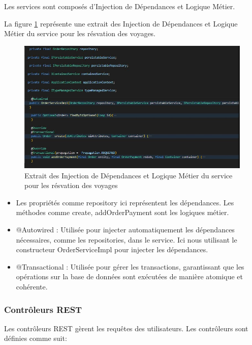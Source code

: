 \documentclass[12pt]{report}
\begin{document}
			Les services sont composés d'Injection de Dépendances et Logique Métier.

			La figure \ref{fig:methService} représente une extrait des Injection de Dépendances et Logique Métier du service pour les résvation des voyages.
			
			\begin{figure}[h]
				\centering
				\includegraphics[width=\textwidth]{methService.jpg}
				\caption{Extrait des Injection de Dépendances et Logique Métier du service pour les résvation des voyages}
				\label{fig:methService}
			\end{figure}
			\FloatBarrier

			\begin{itemize}
				\item Les propriétés comme repository ici représentent les dépendances. Les méthodes comme create, addOrderPayment sont les logiques métier.
				\item @Autowired : Utilisée pour injecter automatiquement les dépendances nécessaires, comme les repositories, dans le service. Ici nous utilisant le constructeur OrderServiceImpl pour injecter les dépendances.
				\item @Transactional : Utilisée pour gérer les transactions, garantissant que les opérations sur la base de données sont exécutées de manière atomique et cohérente.
			\end{itemize}
			

			\subsubsection{Contrôleurs REST}
			
			\hspace{15pt} Les contrôleurs REST gèrent les requêtes des utilisateurs. Les contrôleurs sont définies comme suit:
\end{document}
